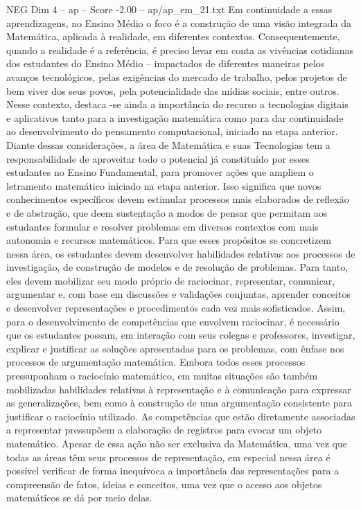 \begin{textsample}{NEG Dim 4 – ap – Score -2.00 – ap/ap\_em\_21.txt}
Em continuidade a essas aprendizagens, no Ensino Médio o foco é a construção de uma visão integrada da Matemática, aplicada à realidade, em diferentes contextos.
Consequentemente, quando a realidade é a referência, é preciso levar em conta as vivências cotidianas dos estudantes do Ensino Médio – impactados de diferentes maneiras pelos avanços tecnológicos, pelas exigências do mercado de trabalho, pelos projetos de bem viver dos seus povos, pela potencialidade das mídias sociais, entre outros.
Nesse contexto, destaca -se ainda a importância do recurso a tecnologias digitais e aplicativos tanto para a investigação matemática como para dar continuidade ao desenvolvimento do pensamento computacional, iniciado na etapa anterior.
Diante dessas considerações, a área de Matemática e suas Tecnologias tem a responsabilidade de aproveitar todo o potencial já constituído por esses estudantes no Ensino Fundamental, para promover ações que ampliem o letramento matemático iniciado na etapa anterior.
Isso significa que novos conhecimentos específicos devem estimular processos mais elaborados de reflexão e de abstração, que deem sustentação a modos de pensar que permitam aos estudantes formular e resolver problemas em diversos contextos com mais autonomia e recursos matemáticos.
Para que esses propósitos se concretizem nessa área, os estudantes devem desenvolver habilidades relativas aos processos de investigação, de construção de modelos e de resolução de problemas.
Para tanto, eles devem mobilizar seu modo próprio de raciocinar, representar, comunicar, argumentar e, com base em discussões e validações conjuntas, aprender conceitos e desenvolver representações e procedimentos cada vez mais sofisticados.
Assim, para o desenvolvimento de competências que envolvem raciocinar, é necessário que os estudantes possam, em interação com seus colegas e professores, investigar, explicar e justificar as soluções apresentadas para os problemas, com ênfase nos processos de argumentação matemática.
Embora todos esses processos pressuponham o raciocínio matemático, em muitas situações são também mobilizadas habilidades relativas à representação e à comunicação para expressar as generalizações, bem como à construção de uma argumentação consistente para justificar o raciocínio utilizado.
As competências que estão diretamente associadas a representar pressupõem a elaboração de registros para evocar um objeto matemático.
Apesar de essa ação não ser exclusiva da Matemática, uma vez que todas as áreas têm seus processos de representação, em especial nessa área é possível verificar de forma inequívoca a importância das representações para a compreensão de fatos, ideias e conceitos, uma vez que o acesso aos objetos matemáticos se dá por meio delas.

\end{textsample}

